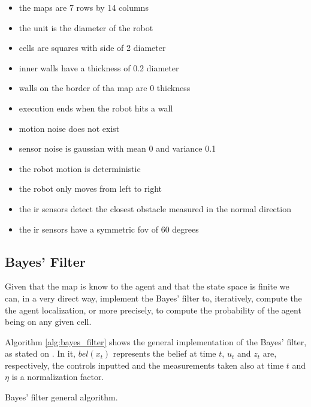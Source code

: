 \documentclass[runningheads]{llncs}
\begin{document}
\begin{itemize}
    \item the maps are 7 rows by 14 columns
    \item the unit is the diameter of the robot
    \item cells are squares with side of 2 diameter 
    \item inner walls have a thickness of 0.2 diameter
    \item walls on the border of tha map are 0 thickness
    \item execution ends when the robot hits a wall
    \item motion noise does not exist 
    \item sensor noise is gaussian with mean 0 and variance 0.1
    \item the robot motion is deterministic 
    \item the robot only moves from left to right
    \item the \Gls{ir} sensors detect the closest obstacle measured in the normal direction
    \item the \Gls{ir} sensors have a symmetric \gls{fov} of 60 degrees
\end{itemize}

\subsection{Bayes' Filter}
\label{subsec:bayes_filter}

Given that the map is know to the agent and that the state space is finite we can, in a very direct way, implement the Bayes' filter to, iteratively, compute the the agent localization, or more precisely, to compute the probability of the agent being on any given cell.

Algorithm \ref{alg:bayes_filter} shows the general implementation of the Bayes' filter, as stated on \cite{thrun2005probabilistic}. In it, $bel(x_t)$ represents the belief at time $t$, $u_t$ and $z_t$ are, respectively, the controls inputted and the measurements taken also at time $t$ and $\eta$ is a normalization factor.

\begin{algorithm}[!ht]
    \DontPrintSemicolon


\caption{Bayes' filter general algorithm.}
\label{alg:bayes_filter}
\end{algorithm}
\FloatBarrier
\end{document}

